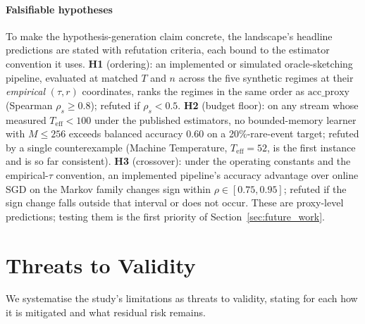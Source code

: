 \documentclass[sensors,article,submit,pdftex,moreauthors]{Definitions/mdpi}
\newcommand{\Teff}{T_{\mathrm{eff}}}
\providecommand{\DIFadd}[1]{{\protect\color{blue}#1}} %
\providecommand{\DIFdel}[1]{} %
\providecommand{\DIFaddbegin}{} %
\providecommand{\DIFaddend}{} %
\providecommand{\DIFdelbegin}{} %
\providecommand{\DIFdelend}{} %
\begin{document}
\paragraph{\DIFadd{Falsifiable hypotheses}} \DIFadd{To make the hypothesis-generation claim concrete, the landscape's headline predictions are stated with refutation criteria, each bound to the estimator convention it uses. }\textbf{\DIFadd{H1}} \DIFadd{(ordering): an implemented or simulated oracle-sketching pipeline, evaluated at matched $T$ and $n$ across the five synthetic regimes at their }\emph{\DIFadd{empirical}} \DIFadd{$(\tau, r)$ coordinates, ranks the regimes in the same order as $\mathrm{acc\_proxy}$ (Spearman $\rho_s \geq 0.8$); refuted if $\rho_s < 0.5$}\DIFaddend . \DIFdelbegin %
\DIFdelend \DIFaddbegin \textbf{\DIFadd{H2}} \DIFadd{(budget floor): on any stream whose measured $\Teff < 100$ under the published estimators, no bounded-memory learner with $M \leq 256$ exceeds balanced accuracy $0.60$ on a 20\%-rare-event target; refuted by a single counterexample (Machine Temperature, $\Teff = 52$, is the first instance and is so far consistent). }\DIFaddend \textbf{\DIFdelbegin \DIFdel{Proxy parameters are not formally equivalent to the exact framework's quantities.}\DIFdelend \DIFaddbegin \DIFadd{H3}\DIFaddend } \DIFdelbegin \DIFdel{Our }\DIFdelend \DIFaddbegin \DIFadd{(crossover): under the operating constants and the empirical-}\DIFaddend $\tau$ \DIFdelbegin \DIFdel{and }\DIFdelend \DIFaddbegin \DIFadd{convention, an implemented pipeline's accuracy advantage over online SGD on the Markov family changes sign within $\rho \in [0.75, 0.95]$; refuted if the sign change falls outside that interval or does not occur. These are proxy-level predictions; testing them is the first priority of Section~\ref{sec:future_work}.
}


\section{\DIFadd{Threats to Validity}}
\label{sec:threats}

\DIFadd{We systematise the study's limitations as threats to validity, stating for each how it is mitigated and what residual risk remains.
}
\end{document}
